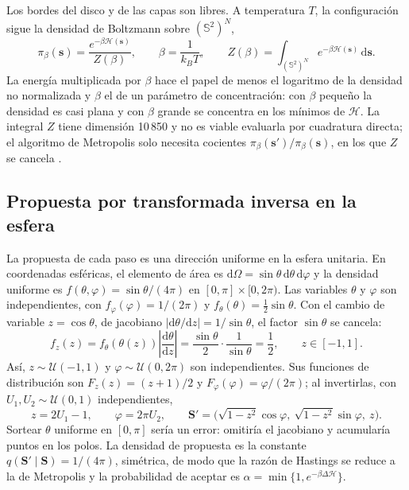 Los bordes del disco y de las capas son libres. A temperatura $T$, la configuración sigue la densidad de Boltzmann sobre $(\mathbb S^2)^N$,
\begin{equation}
\pi_\beta(\mathbf s)=\frac{e^{-\beta\mathcal H(\mathbf s)}}{Z(\beta)},\qquad \beta=\frac{1}{k_BT},\qquad Z(\beta)=\int_{(\mathbb S^2)^N}e^{-\beta\mathcal H(\mathbf s)}\,\mathrm d\mathbf s .
\label{eq:boltzmann}
\end{equation}
La energía multiplicada por $\beta$ hace el papel de menos el logaritmo de la densidad no normalizada y $\beta$ el de un parámetro de concentración: con $\beta$ pequeño la densidad es casi plana y con $\beta$ grande se concentra en los mínimos de $\mathcal H$. La integral $Z$ tiene dimensión 10\,850 y no es viable evaluarla por cuadratura directa; el algoritmo de Metropolis solo necesita cocientes $\pi_\beta(\mathbf s')/\pi_\beta(\mathbf s)$, en los que $Z$ se cancela \citep{metropolis1953,hastings1970}.

\subsection{Propuesta por transformada inversa en la esfera}

La propuesta de cada paso es una dirección uniforme en la esfera unitaria. En coordenadas esféricas, el elemento de área es $\mathrm d\Omega=\sin\theta\,\mathrm d\theta\,\mathrm d\varphi$ y la densidad uniforme es $f(\theta,\varphi)=\sin\theta/(4\pi)$ en $[0,\pi]\times[0,2\pi)$. Las variables $\theta$ y $\varphi$ son independientes, con $f_\varphi(\varphi)=1/(2\pi)$ y $f_\theta(\theta)=\tfrac12\sin\theta$. Con el cambio de variable $z=\cos\theta$, de jacobiano $|\mathrm d\theta/\mathrm dz|=1/\sin\theta$, el factor $\sin\theta$ se cancela:
\begin{equation}
f_z(z)=f_\theta(\theta(z))\left|\frac{\mathrm d\theta}{\mathrm dz}\right|=\frac{\sin\theta}{2}\cdot\frac{1}{\sin\theta}=\frac12,\qquad z\in[-1,1].
\end{equation}
Así, $z\sim\mathcal U(-1,1)$ y $\varphi\sim\mathcal U(0,2\pi)$ son independientes. Sus funciones de distribución son $F_z(z)=(z+1)/2$ y $F_\varphi(\varphi)=\varphi/(2\pi)$; al invertirlas, con $U_1,U_2\sim\mathcal U(0,1)$ independientes,
\begin{equation}
z=2U_1-1,\qquad \varphi=2\pi U_2,\qquad \mathbf S'=\big(\sqrt{1-z^2}\cos\varphi,\ \sqrt{1-z^2}\sin\varphi,\ z\big).
\label{eq:inversa}
\end{equation}
Sortear $\theta$ uniforme en $[0,\pi]$ sería un error: omitiría el jacobiano y acumularía puntos en los polos. La densidad de propuesta es la constante $q(\mathbf S'\mid\mathbf S)=1/(4\pi)$, simétrica, de modo que la razón de Hastings se reduce a la de Metropolis y la probabilidad de aceptar es $\alpha=\min\{1,e^{-\beta\Delta\mathcal H}\}$.

